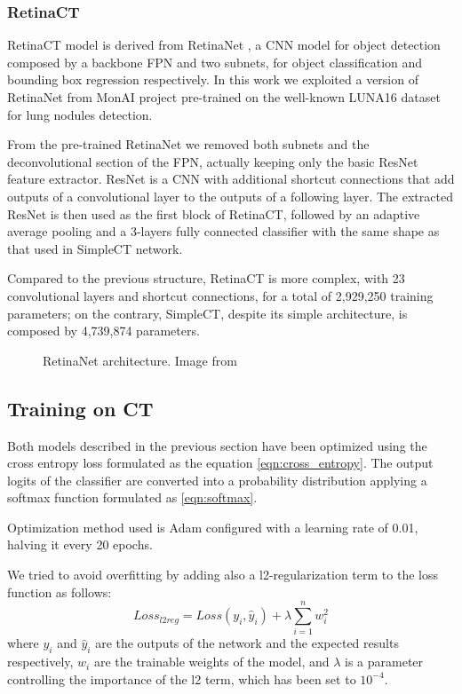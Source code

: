 \subsubsection{RetinaCT}
RetinaCT model is derived from RetinaNet \cite{lin2017focal}, a CNN model for object detection composed by a backbone FPN and two subnets, for object classification and bounding box regression respectively.
In this work we exploited a version of RetinaNet from MonAI project \cite{MONAI} pre-trained on the well-known LUNA16 \cite{luna16} dataset for lung nodules detection. 

From the pre-trained RetinaNet we removed both subnets and the deconvolutional section of the FPN, actually keeping only the basic ResNet \cite{he2016deep} feature extractor.
ResNet is a CNN with additional shortcut connections that add outputs of a convolutional layer to the outputs of a following layer.
The extracted ResNet is then used as the first block of RetinaCT, followed by an adaptive average pooling and a 3-layers fully connected classifier with the same shape as that used in SimpleCT network.

Compared to the previous structure, RetinaCT is more complex, with 23 convolutional layers and shortcut connections, for a total of 2,929,250 training parameters; on the contrary, SimpleCT, despite its simple architecture, is composed by 4,739,874 parameters.

\begin{figure}
    \centering
    \caption{RetinaNet architecture. Image from \cite{lin2017focal}}
    \label{fig:retina_net_architecture}
\end{figure}


\subsection{Training on CT}
Both models described in the previous section have been optimized using the cross entropy loss formulated as the equation \ref{eqn:cross_entropy}.
The output logits of the classifier are converted into a probability distribution applying a softmax function formulated as \ref{eqn:softmax}.

Optimization method used is Adam \cite{kingma2014} configured with a learning rate of 0.01, halving it every 20 epochs.

We tried to avoid overfitting by adding also a l2-regularization term to the loss function as follows:
\begin{equation}
    Loss_{l2reg} = Loss(y_i, \hat{y}_i) + \lambda\sum\limits_{i=1}^n w_i^2
    \label{eqn:l2_regularization}
\end{equation}
where $y_i$ and $\hat{y}_i$ are the outputs of the network and the expected results respectively, $w_i$ are the trainable weights of the model, and $\lambda$ is a parameter controlling the importance of the l2 term, which has been set to $10^{-4}$.

